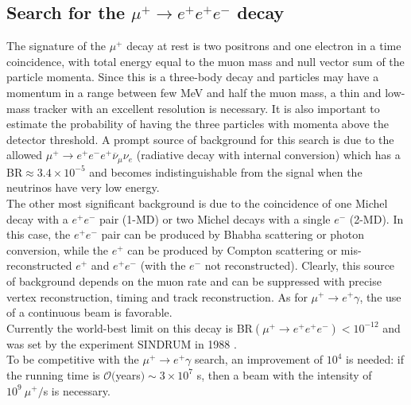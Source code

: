 \documentclass[12pt,a4paper,openright, oneside, titlepage]{book} %
\begin{document}
\subsection{Search for the $\mu^+ \rightarrow e^+ e^+e^-$ decay}
The signature of the $\mu^+$ decay at rest is two positrons and one electron in a time coincidence, 
with total energy equal to the muon mass and null vector sum of the particle momenta.
Since this is a three-body decay and particles may have a momentum in a range between
few MeV and half the muon mass, a thin and low-mass tracker with an excellent resolution is necessary.
It is also important to estimate the probability of having the three particles with momenta above the detector threshold.
A prompt source of background for this search is due to the allowed 
$\mu^+\rightarrow e^+e^-e^+\overline{\nu}_{\mu}\nu_e$ (radiative decay with internal conversion) 
which has a BR$\approx 3.4\times 10^{-5}$ 
and becomes indistinguishable from the signal when the neutrinos have very low energy. \\
The other most significant background is due to the coincidence of one Michel decay 
with a $e^+e^-$ pair (1-MD) or two Michel decays with a single $e^-$ (2-MD). 
In this case, the $e^+e^-$ pair can be produced by Bhabha scattering or photon conversion, 
while the $e^+$ can be produced by Compton scattering or mis-reconstructed $e^+$ and $e^+e^-$ (with the $e^-$ not reconstructed). Clearly, this source of background depends on the muon rate and can be suppressed 
with precise vertex reconstruction, timing and track reconstruction.
As for $\mu^+ \rightarrow e^+ \gamma$, the use of a continuous beam is favorable.\\
Currently the world-best limit on this decay is BR$(\mu^+ \rightarrow e^+ e^+e^-)<10^{-12}$ 
and was set by the experiment SINDRUM in 1988 \cite{SINDRUM}.\\
To be competitive with the $\mu^+\rightarrow e^+\gamma$ search, 
an improvement of $10^4$ is needed: 
if the running time is $\mathcal{O}($years$)\sim 3\times 10^7$ s, 
then a beam with the intensity of $10^9\ \mu^+/$s is necessary.
\end{document}
